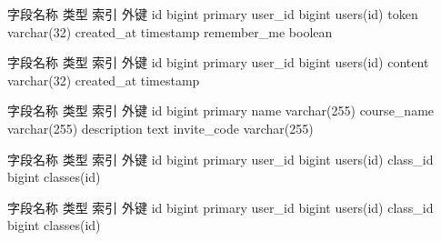{}\markdownRendererInterblockSeparator
{}\begin{center}\markdownRendererInterblockSeparator
{}%
{{字段名称}%
{类型}%
{索引}%
{外键}%
}%
{{id}%
{bigint}%
{primary}%
{}%
}%
{{user\_id}%
{bigint}%
{}%
{users(id)}%
}%
{{token}%
{varchar(32)}%
{}%
{}%
}%
{{created\_at}%
{timestamp}%
{}%
{}%
}%
{{remember\_me}%
{boolean}%
{}%
{}%
}%
\markdownRendererInterblockSeparator
{}\end{center}\markdownRendererInterblockSeparator
{}\markdownRendererInterblockSeparator
{}\begin{center}\markdownRendererInterblockSeparator
{}%
{{字段名称}%
{类型}%
{索引}%
{外键}%
}%
{{id}%
{bigint}%
{primary}%
{}%
}%
{{user\_id}%
{bigint}%
{}%
{users(id)}%
}%
{{content}%
{varchar(32)}%
{}%
{}%
}%
{{created\_at}%
{timestamp}%
{}%
{}%
}%
\markdownRendererInterblockSeparator
{}\end{center}\markdownRendererInterblockSeparator
{}\markdownRendererInterblockSeparator
{}\begin{center}\markdownRendererInterblockSeparator
{}%
{{字段名称}%
{类型}%
{索引}%
{外键}%
}%
{{id}%
{bigint}%
{primary}%
{}%
}%
{{name}%
{varchar(255)}%
{}%
{}%
}%
{{course\_name}%
{varchar(255)}%
{}%
{}%
}%
{{description}%
{text}%
{}%
{}%
}%
{{invite\_code}%
{varchar(255)}%
{}%
{}%
}%
\markdownRendererInterblockSeparator
{}\end{center}\markdownRendererInterblockSeparator
{}\markdownRendererInterblockSeparator
{}\begin{center}\markdownRendererInterblockSeparator
{}%
{{字段名称}%
{类型}%
{索引}%
{外键}%
}%
{{id}%
{bigint}%
{primary}%
{}%
}%
{{user\_id}%
{bigint}%
{}%
{users(id)}%
}%
{{class\_id}%
{bigint}%
{}%
{classes(id)}%
}%
\markdownRendererInterblockSeparator
{}\end{center}\markdownRendererInterblockSeparator
{}\markdownRendererInterblockSeparator
{}\begin{center}\markdownRendererInterblockSeparator
{}%
{{字段名称}%
{类型}%
{索引}%
{外键}%
}%
{{id}%
{bigint}%
{primary}%
{}%
}%
{{user\_id}%
{bigint}%
{}%
{users(id)}%
}%
{{class\_id}%
{bigint}%
{}%
{classes(id)}%
}%
\markdownRendererInterblockSeparator
{}\end{center}\markdownRendererInterblockSeparator
